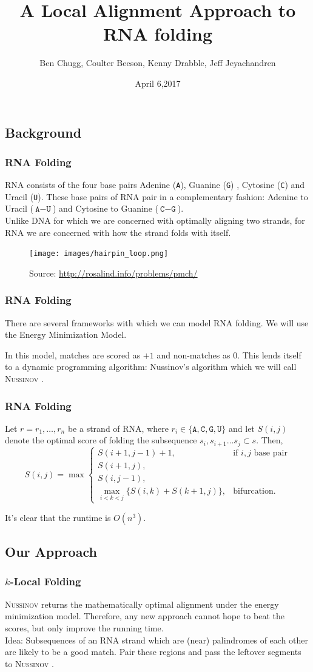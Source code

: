 \documentclass{beamer}
\title{A Local Alignment Approach to RNA folding}
\author{Ben Chugg, Coulter Beeson, Kenny Drabble, Jeff Jeyachandren}
\institute{\textsc{The University of British Columbia}}
\date{April 6,2017}
\newcommand{\A}{\texttt{A}}
\newcommand{\G}{\texttt{G}}
\newcommand{\U}{\texttt{U}}
\newcommand{\C}{\texttt{C}}
\newcommand{\rf}{\textsc{Nussinov} }
\newcommand{\s}{\vspace{1cm}}
\begin{document}
\begin{frame}
\titlepage
\end{frame}


\begin{frame}
\section*{Background}
\frametitle{RNA Folding}
RNA consists of the four base pairs Adenine (\A), Guanine (\G) , Cytosine (\C) and Uracil (\U). These base pairs of RNA pair in a complementary fashion: Adenine to Uracil ($\A-\U$) and Cytosine to Guanine ($\C-\G$). \\

Unlike DNA for which we are concerned with optimally aligning two strands, for RNA we are concerned with how the strand folds with itself. 

\begin{figure}
\centering
\texttt{[image: images/hairpin\_loop.png]}
\vspace{-0.2cm}
\caption{Source: \url{http://rosalind.info/problems/pmch/}}
\end{figure}
\end{frame}

\begin{frame}
\frametitle{RNA Folding}
There are several frameworks with which we can model RNA folding. We will use the Energy Minimization Model. \s

In this model, matches are scored as $+1$ and non-matches as 0. This lends itself to a dynamic programming algorithm: Nussinov's algorithm which we will call \rf. 
\end{frame}

\begin{frame}
\frametitle{RNA Folding}
Let $r=r_1,\ldots,r_n$ be a strand of RNA, where $r_i\in\{\A,\C,\G,\U\}$ and let $S(i,j)$ denote the optimal score of folding the subsequence $s_i,s_{i+1}\ldots s_j\subset s$. Then, 
\[S(i,j)=\max\begin{cases}
S(i+1,j-1)+1,&\text{if }i,j\text{ base pair}\\
S(i+1,j),\\
S(i,j-1),\\
\displaystyle \max_{i<k<j}\{S(i,k)+S(k+1,j)\},&\text{bifurcation}.
\end{cases}\]

It's clear that the runtime is $O(n^3)$. 
\end{frame}


\begin{frame}
\section{Our Approach}
\frametitle{$k$-Local Folding}
\rf returns the mathematically optimal alignment under the energy minimization model. Therefore, any new approach cannot hope to beat the scores, but only improve the running time. \\

Idea: Subsequences of an RNA strand which are (near) palindromes of each other are likely to be a good match. Pair these regions and pass the leftover segments to \rf. 
\end{frame}
\end{document}

